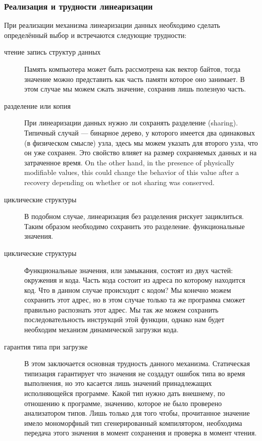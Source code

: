 \subsubsection{Реализация и трудности линеаризации}
\label{subsubsec:realization_and_difficulties_of_linearization}

При реализации механизма линеаризации данных необходимо сделать определённый 
выбор и встречаются следующие трудности:

\begin{description}
	\item[чтение запись структур данных] Память компьютера может быть 
рассмотрена как вектор байтов, тогда значение  можно представить как часть 
памяти которое оно занимает. В этом случае мы можем  сжать значение, сохранив 
лишь полезную часть.

	\item[разделение или копия] При линеаризации данных нужно ли сохранять 
разделение (sharing). Типичный случай --- бинарное дерево, у которого имеется 
два одинаковых (в физическом смысле) узла, здесь мы можем указать для второго 
узла, что он уже сохранен. Это свойство влияет на размер сохраняемых данных и на 
затраченное время. On the other hand, in the presence of physically modifiable 
values, this could change the behavior of this value after a recovery depending 
on whether or not sharing was conserved.

	\item[циклические структуры] В подобном случае, линеаризация без разделения 
рискует зациклиться. Таким образом необходимо сохранить это разделение. 
функциональные значения.

	\item[циклические структуры] Функциональные значения, или замыкания, состоят 
из двух частей: окружения и кода. Часть кода состоит из адреса по которому 
находится код. Что в данном случае происходит с кодом? Мы конечно можем 
сохранить этот адрес, но в этом случае только та же программа сможет правильно 
распознать этот адрес. Мы так же можем сохранить последовательность инструкций 
этой функции, однако нам будет необходим механизм динамической загрузки кода.

	\item[гарантия типа при загрузке] В этом заключается основная трудность 
данного механизма. Статическая типизация гарантирует что значения не создадут 
ошибок типа во время выполнения, но это касается лишь значений принадлежащих 
исполняющейся программе. Какой тип нужно дать внешнему, по отношению к 
программе, значению, которое не было проверено анализатором типов. Лишь только 
для того чтобы, прочитанное значение имело мономорфный тип сгенерированный 
компилятором, необходима передача этого значения в момент сохранения и проверка 
в момент чтения.
\end{description}

